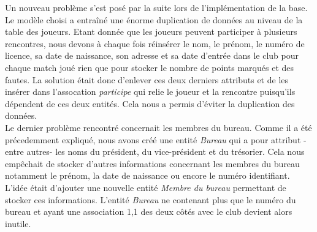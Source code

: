 \documentclass{article}
\begin{document}
Un nouveau problème s'est posé par la suite lors de l'implémentation de la base. Le modèle choisi a entraîné une énorme duplication de données au niveau de la table des joueurs. Etant donnée que les joueurs peuvent participer à plusieurs rencontres, nous devons à chaque fois réinsérer le nom, le prénom, le numéro de licence, sa date de naissance, son adresse et sa date d'entrée dans le club pour chaque match joué rien que pour stocker le nombre de points marqués et des fautes. La solution était donc d'enlever ces deux derniers attributs et de les insérer dans l'assocation \textit{participe} qui relie le joueur et la rencontre puisqu'ils dépendent de ces deux entités. Cela nous a permis d'éviter la duplication des données.
\\


Le dernier problème rencontré concernait les membres du bureau. Comme il a été précedemment expliqué, nous avons créé une entité \textit{Bureau} qui a pour attribut -entre autres- les noms du président, du vice-président et du trésorier. Cela nous empêchait de stocker d'autres informations concernant les membres du bureau notamment le prénom, la date de naissance ou encore le numéro identifiant. L'idée était d'ajouter une nouvelle entité \textit{Membre du bureau} permettant de stocker ces informations. L'entité \textit{Bureau} ne contenant plus que le numéro du bureau et ayant une association 1,1 des deux côtés avec le club devient alors inutile.  
\end{document}
